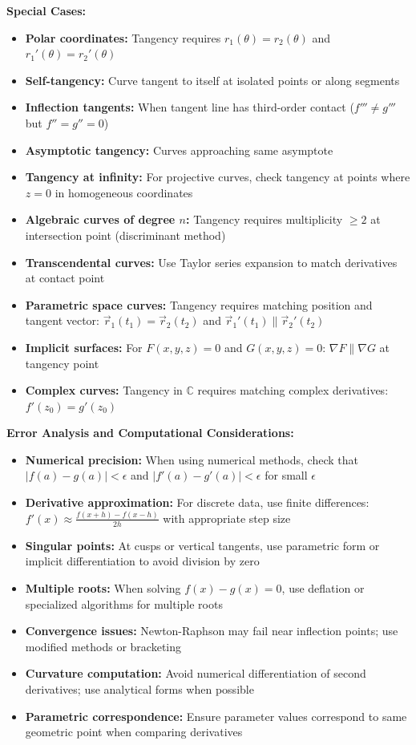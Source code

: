 \documentclass[12pt]{article}
\begin{document}
\textbf{Special Cases:}
\begin{itemize}
    \item \textbf{Polar coordinates:} Tangency requires $r_1(\theta) = r_2(\theta)$ and $r_1'(\theta) = r_2'(\theta)$
    \item \textbf{Self-tangency:} Curve tangent to itself at isolated points or along segments
    \item \textbf{Inflection tangents:} When tangent line has third-order contact ($f''' \neq g'''$ but $f'' = g'' = 0$)
    \item \textbf{Asymptotic tangency:} Curves approaching same asymptote
    \item \textbf{Tangency at infinity:} For projective curves, check tangency at points where $z = 0$ in homogeneous coordinates
    \item \textbf{Algebraic curves of degree $n$:} Tangency requires multiplicity $\geq 2$ at intersection point (discriminant method)
    \item \textbf{Transcendental curves:} Use Taylor series expansion to match derivatives at contact point
    \item \textbf{Parametric space curves:} Tangency requires matching position and tangent vector: $\vec{r}_1(t_1) = \vec{r}_2(t_2)$ and $\vec{r}_1'(t_1) \parallel \vec{r}_2'(t_2)$
    \item \textbf{Implicit surfaces:} For $F(x,y,z) = 0$ and $G(x,y,z) = 0$: $\nabla F \parallel \nabla G$ at tangency point
    \item \textbf{Complex curves:} Tangency in $\mathbb{C}$ requires matching complex derivatives: $f'(z_0) = g'(z_0)$
\end{itemize}

\textbf{Error Analysis and Computational Considerations:}
\begin{itemize}
    \item \textbf{Numerical precision:} When using numerical methods, check that $|f(a) - g(a)| < \epsilon$ and $|f'(a) - g'(a)| < \epsilon$ for small $\epsilon$
    \item \textbf{Derivative approximation:} For discrete data, use finite differences: $f'(x) \approx \frac{f(x+h) - f(x-h)}{2h}$ with appropriate step size
    \item \textbf{Singular points:} At cusps or vertical tangents, use parametric form or implicit differentiation to avoid division by zero
    \item \textbf{Multiple roots:} When solving $f(x) - g(x) = 0$, use deflation or specialized algorithms for multiple roots
    \item \textbf{Convergence issues:} Newton-Raphson may fail near inflection points; use modified methods or bracketing
    \item \textbf{Curvature computation:} Avoid numerical differentiation of second derivatives; use analytical forms when possible
    \item \textbf{Parametric correspondence:} Ensure parameter values correspond to same geometric point when comparing derivatives
\end{itemize}
\end{document}
